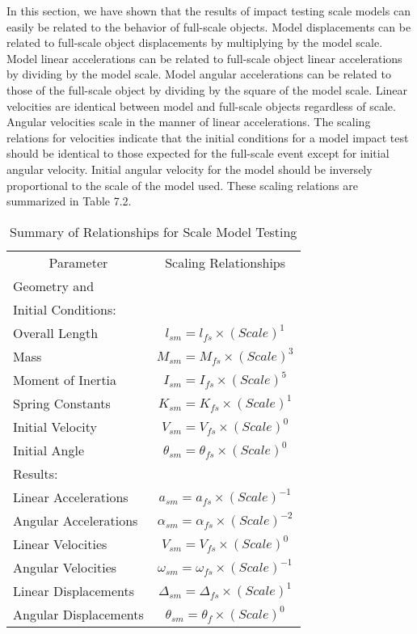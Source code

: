      In this section, we have shown that the results of impact testing
scale models can easily be related to the behavior of full-scale
objects.  Model displacements can be related to full-scale object
displacements by multiplying by the model scale.  Model linear
accelerations can be related to full-scale object linear accelerations
by dividing by the model scale.  Model angular accelerations can be
related to those of the full-scale object by dividing by the square of
the model scale. Linear velocities are identical between model and
full-scale objects regardless of scale.  Angular velocities scale in
the manner of linear accelerations.  The scaling relations for
velocities indicate that the initial conditions for a model impact
test should be identical to those expected for the full-scale event
except for initial angular velocity.  Initial angular velocity for the
model should be inversely proportional to the scale of the model used.
These scaling relations are summarized in Table 7.2.
\begin{table}
\begin{center}
\caption{Summary of Relationships for Scale Model Testing}
\makeqnum
\begin{tabular}{||l|c||}
\hline
\multicolumn{1}{|c}{Parameter}
 &\multicolumn{1}{|c||}{Scaling Relationships}\\
Geometry and & \\
Initial Conditions: &\\
\quad Overall Length     & $l_{sm} = l_{fs} \times (Scale)^{1}$\\
\quad Mass               & $M_{sm} = M_{fs} \times (Scale)^{3}$\\
\quad Moment of Inertia  & $I_{sm} = I_{fs} \times (Scale)^{5}$\\
\quad Spring Constants   & $K_{sm} = K_{fs} \times (Scale)^{1}$\\
\quad Initial Velocity   & $V_{sm} = V_{fs} \times (Scale)^{0}$\\
\quad Initial Angle      & $\theta _{sm} = \theta _{fs} \times
(Scale)^{0}$\\
\hline
Results: & \\
\quad    Linear Accelerations  & $a_{sm} = a_{fs} \times (Scale)^{-1}$\\
\quad    Angular Accelerations & $\alpha _{sm} = \alpha _{fs} \times
(Scale)^{-2}$\\
\quad    Linear Velocities     & $V_{sm} = V_{fs} \times (Scale)^{0}$\\
\quad    Angular Velocities    & $\omega _{sm} = \omega _{fs} \times
(Scale)^{-1}$\\
\quad    Linear Displacements  & $\Delta _{sm} = \Delta _{fs} \times
(Scale)^{1}$\\
\quad    Angular Displacements & $\theta _{sm} = \theta _{f} \times
(Scale)^{0}$\\
\hline
\end{tabular}
\end{center}
\end{table}
